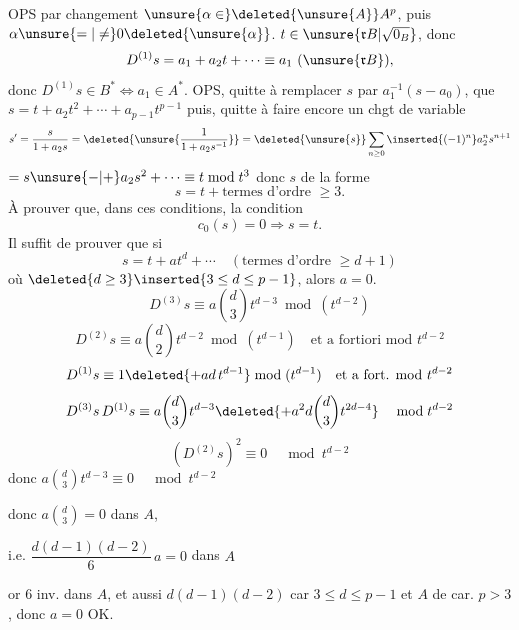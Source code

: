 OPS  par changement $\unsure{\alpha\in}\deleted{\unsure{A}}A^p$, puis $\alpha\unsure{=|\ne}0\deleted{\unsure{\alpha}}$.  $t\in\unsure{\mathfrak r B|\sqrt{0_B}}$, donc
\[
D^{(1)}s=a_1+a_2t+\cdots\equiv a_1\ (\unsure{\mathfrak r B}),
\]
donc $D^{(1)}s\in B^*\Longleftrightarrow a_1\in A^*$. OPS, quitte à remplacer $s$ par $a_1^{-1}(s-a_0)$, que $s=t+a_2t^2+\cdots+a_{p-1}t^{p-1}$ puis, quitte à faire encore un chgt de variable 
\[
s'=\frac{s}{1+a_2s}=\deleted{\unsure{\frac1{1+a_2s^{-1}}}}=\deleted{\unsure{s}}\sum_{n\ge0}\inserted{(-1)^n}a_2^n s^{n+1}
\]
$=s\unsure{-|+}a_2s^2+\cdots\equiv t\bmod t^3$ donc $s$ de la forme
\[
s=t+\text{termes d'ordre }\ge3.
\]
 À prouver que, dans ces conditions, la condition
\[
c_0(s)=0\Longrightarrow s=t.
\]
 Il suffit de prouver que si
\[
s=t+at^d+\cdots\quad(\text{termes d'ordre }\ge d+1)
\]
où $\deleted{d\ge3}\inserted{3\le d\le p-1}$, alors $a=0$.
\[
D^{(3)}s\equiv a\binom d3t^{d-3}\bmod(t^{d-2})
\]
\[
D^{(2)}s\equiv a\binom d2t^{d-2}\bmod(t^{d-1})\quad\text{et a fortiori mod }t^{d-2}
\]
\[
D^{(1)}s\equiv1\deleted{+ad\,t^{d-1}}\bmod(t^{d-1})\quad\text{et a fort. mod }t^{d-2}
\]
\[
D^{(3)}s\,D^{(1)}s\equiv a\binom d3t^{d-3}\deleted{+a^2d\binom d3t^{2d-4}}\quad\bmod t^{d-2}
\]
\[
(D^{(2)}s)^2\equiv0\quad\bmod t^{d-2}
\]
donc $a\binom d3t^{d-3}\equiv0\quad\bmod t^{d-2}$

donc $a\binom d3=0$ dans $A$,

i.e. $\dfrac{d(d-1)(d-2)}6\,a=0$ dans $A$

or 6 inv. dans $A$, et aussi $d(d-1)(d-2)$ car $3\le d\le p-1$ et $A$ de car. $p>3$, donc $a=0$ OK.
